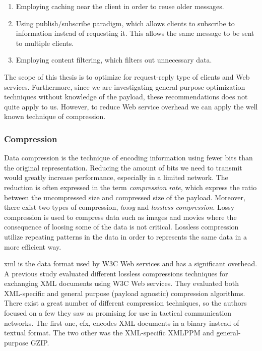 \begin{enumerate}
    \item Employing caching near the client in order to reuse older messages.
    \item Using publish/subscribe paradigm, which allows clients to subscribe to
    information instead of requesting it. This allows the same message to be sent
    to multiple clients.
    \item Employing content filtering, which filters out unnecessary data.
\end{enumerate}

The scope of this thesis is to optimize for request-reply type of clients
and Web services. Furthermore, since we are investigating general-purpose
optimization techniques without knowledge of the payload, these
recommendations does not quite apply to us. However, to reduce Web service
overhead we can apply the well known technique of compression.

\subsubsection{Compression}

Data compression is the technique of encoding information using fewer bits than
the original representation. Reducing the amount of bits we need to transmit
would greatly increase performance, especially in  a limited network. The
reduction is often expressed in the term \textit{compression rate}, which
express the ratio between the uncompressed size and compressed size of the
payload.  Moreover, there exist two types of compression, \textit{lossy} and
\textit{lossless compression}. Lossy compression is used to compress data such
as images and movies where the consequence of loosing some of the data is not
critical. Lossless compression utilize repeating patterns in the data in order
to represents the same data in a more efficient way.

\gls{xml} is the data format used by W3C Web services and has a significant
overhead. A previous study evaluated different lossless compressions techniques
for exchanging XML documents using W3C Web services\cite{johnsen-compression}.
They evaluated both XML-specific and general purpose (payload agnostic)
compression algorithms. There exist a great number of different compression
techniques, so the authors focused on a few they saw as promising for use in
tactical communication networks. The first one, \gls{efx}, encodes XML documents
in a binary instead of textual format. The two other was the XML-specific XMLPPM
and general-purpose GZIP.

